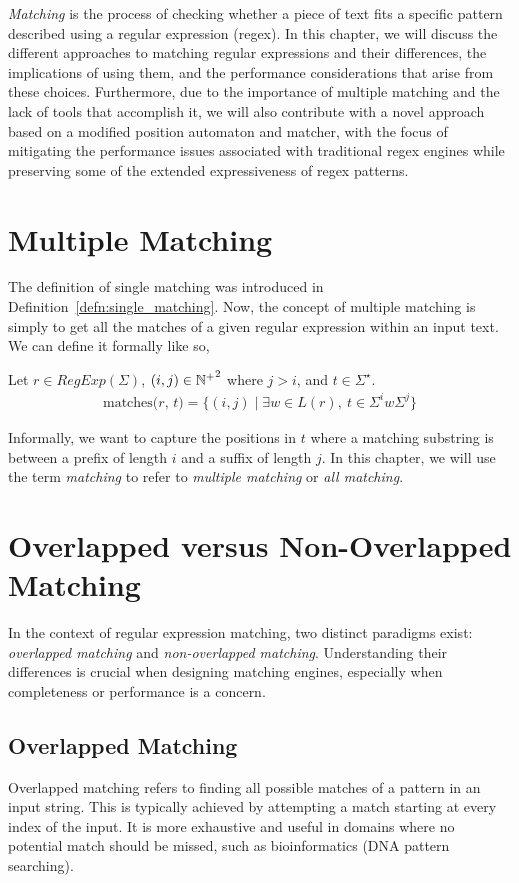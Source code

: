 \emph{Matching} is the process of checking whether a piece of text fits a specific pattern described using a regular expression (regex).
In this chapter, we will discuss the different approaches to matching regular expressions and their differences, the implications of using them, and the performance considerations that arise from these choices. Furthermore, due to the importance of multiple matching and the lack of tools that accomplish it, we will also contribute with a novel approach based on a modified position automaton and matcher, with the focus of mitigating the performance issues associated with traditional regex engines while preserving some of the extended expressiveness of regex patterns.

\section{Multiple Matching}
\label{sec:multimatching}
The definition of single matching was introduced in Definition~\ref{defn:single_matching}. Now, the concept of multiple matching is simply to get all the matches of a given regular expression within an input text.
We can define it formally like so,
\begin{defn}
	Let $r \in RegExp(\Sigma)$, $(i,j) \in {\mathbb{N}^{+}}^2$ where $j>i$, and $t \in \Sigma^\star$.
	\begin{align*}
		\text{matches($r$, $t$)} = \{
			(i,j) \mid \exists w \in L(r), \ t \in \Sigma^i w \Sigma^j
		\}
	\end{align*}
\end{defn}
Informally, we want to capture the positions in $t$ where a matching substring is between a prefix of length $i$ and a suffix of length $j$.
In this chapter, we will use the term \textit{matching} to refer to \textit{multiple matching} or \textit{all matching}.

\section{Overlapped versus Non-Overlapped Matching}
\label{sec:overlap-vs-nonoverlap}

In the context of regular expression matching, two distinct paradigms exist: \emph{overlapped matching} and \emph{non-overlapped matching}. Understanding their differences is crucial when designing matching engines, especially when completeness or performance is a concern.

\subsection*{Overlapped Matching}
Overlapped matching refers to finding all possible matches of a pattern in an input string. This is typically achieved by attempting a match starting at every index of the input. It is more exhaustive and useful in domains where no potential match should be missed, such as bioinformatics (DNA pattern searching).

